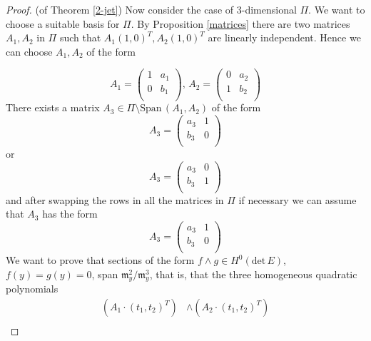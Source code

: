 \documentclass[a4paper]{amsart}
\theoremstyle{plain}
\theoremstyle{definition}
\begin{document}
\begin{proof}{(of Theorem \ref{2-jet})}
    Now consider the case of $3$-dimensional $\Pi$. We want to choose a suitable basis for $\Pi$.
    By Proposition \ref{matrices} there are two matrices $A_1, A_2$ in $\Pi$ such that $A_1 (1, 0)^T, A_2 (1, 0)^T$ are linearly independent. Hence we can choose $A_1, A_2$ of the form
    {\sloppy

    }
    \begin{equation*}
        A_1 =\begin{pmatrix}
            1&a_1\\
            0&b_1\\
        \end{pmatrix},\,
        A_2 =\begin{pmatrix}
            0&a_2\\
            1&b_2\\
        \end{pmatrix}
    \end{equation*}
    There exists a matrix $A_3 \in \Pi \setminus \mathrm{Span}\, (A_1, A_2)$ of the form
    \begin{equation*}
        A_3 =\begin{pmatrix}
            a_3&1\\
            b_3&0\\
        \end{pmatrix}
    \end{equation*}
    or
    \begin{equation*}
        A_3 =\begin{pmatrix}
            a_3&0\\
            b_3&1\\
        \end{pmatrix}
    \end{equation*}
    and after swapping the rows in all the matrices in $\Pi$ if necessary we can assume that $A_3$ has the form
    \begin{equation*}
        A_3 =\begin{pmatrix}
            a_3&1\\
            b_3&0\\
        \end{pmatrix}
    \end{equation*}
    We want to prove that sections of the form $f\wedge g \in H^0(\mathrm{det}\, E)$, $f(y) = g(y) = 0$, span $\mathfrak m_y^2/\mathfrak m_y^3$,
    that is, that the three homogeneous quadratic polynomials 
    \begin{align*}
    (A_1 \cdot (t_1, t_2)^T) &\wedge (A_2 \cdot (t_1, t_2)^T)\\

\end{align*}
\end{proof}
\end{document}
